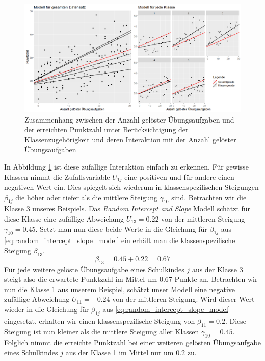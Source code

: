 \documentclass[12pt]{article}\usepackage[]{graphicx}\usepackage[]{color}
\numberwithin{equation}{section}
\begin{document}
\begin{figure}[ht!]
\centering
\includegraphics[width = \textwidth]{random_intercept_slope}
\caption{Zusammenhang zwischen der Anzahl gelöster Übungsaufgaben und der erreichten Punktzahl unter Berücksichtigung der Klassenzugehörigkeit und deren Interaktion mit der Anzahl gelöster Übungsaufgaben}
\label{fig:random_intercept_slope}
\end{figure}
In Abbildung \ref{fig:random_intercept_slope} ist diese zufällige Interaktion einfach zu erkennen. Für gewisse Klassen nimmt die Zufallsvariable $U_{1j}$ eine positiven und für andere einen negativen Wert ein. Dies spiegelt sich wiederum in klassenspezifischen Steigungen $\beta_{1j}$ die höher oder tiefer als die mittlere Steigung $\gamma_{10}$ sind. Betrachten wir die Klasse 3 unseres Beispiels. Das \textit{Random Intercept and Slope} Modell schätzt für diese Klasse eine zufällige Abweichung $U_{13} = 0.22$ von der mittleren Steigung $\gamma_{10} = 0.45$. Setzt man nun diese beide Werte in die Gleichung für $\beta_{1j}$ aus \eqref{eq:random_intercept_slope_model} ein erhält man die klassenspezifische Steigung $\beta_{13}$.
\begin{equation} \label{eq:beta1_example}	
\beta_{13} = 0.45 + 0.22 = 0.67
\end{equation} 
Für jede weitere gelöste Übungsaufgabe eines Schulkindes $j$ aus der Klasse 3 steigt also die erwartete Punktzahl im Mittel um $0.67$ Punkte an. Betrachten wir nun die Klasse 1 aus unserem Beispiel, schätzt unser Modell eine negative zufällige Abweichung $U_{11} = -0.24$ von der mittleren Steigung. Wird dieser Wert wieder in die Gleichung für $\beta_{1j}$ aus \eqref{eq:random_intercept_slope_model} eingesetzt, erhalten wir einen klassenspezifische Steigung von $\beta_{11} = 0.2$. Diese Steigung ist nun kleiner als die mittlere Steigung aller Klassen $\gamma_{10} = 0.45$. Folglich nimmt die erreichte Punktzahl bei einer weiteren gelösten Übungsaufgabe eines Schulkindes $j$ aus der Klasse 1 im Mittel nur um $0.2$ zu. 
\end{document}
